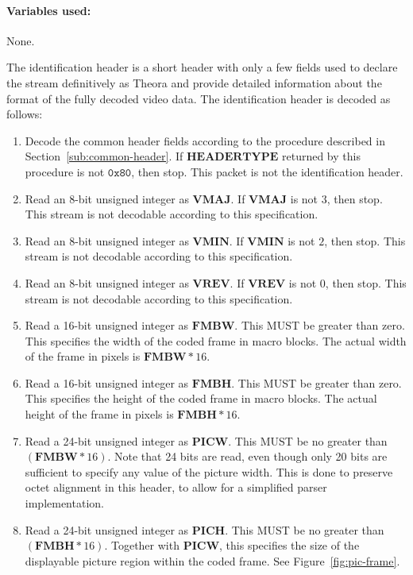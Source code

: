 \documentclass[9pt,letterpaper]{book}
\newcommand{\bitvar}[1]{\ensuremath{\mathbf{\bm{#1}}}}
\newcommand{\hex}[1]{\ensuremath{\mathtt{0x#1}}}
\numberwithin{equation}{chapter}
\numberwithin{figure}{chapter}
\numberwithin{table}{chapter}
\begin{document}
\paragraph{Variables used:} None.
\medskip

The identification header is a short header with only a few fields used to
 declare the stream definitively as Theora and provide detailed information
 about the format of the fully decoded video data.
The identification header is decoded as follows:

\begin{enumerate}
\item
Decode the common header fields according to the procedure described in
 Section~\ref{sub:common-header}.
If \bitvar{HEADERTYPE} returned by this procedure is not \hex{80}, then stop.
This packet is not the identification header.
\item
Read an 8-bit unsigned integer as \bitvar{VMAJ}.
If \bitvar{VMAJ} is not $3$, then stop.
This stream is not decodable according to this specification.
\item
Read an 8-bit unsigned integer as \bitvar{VMIN}.
If \bitvar{VMIN} is not $2$, then stop.
This stream is not decodable according to this specification.
\item
Read an 8-bit unsigned integer as \bitvar{VREV}.
If \bitvar{VREV} is not $0$, then stop.
This stream is not decodable according to this specification.
\item
Read a 16-bit unsigned integer as \bitvar{FMBW}.
This MUST be greater than zero.
This specifies the width of the coded frame in macro blocks.
The actual width of the frame in pixels is $\bitvar{FMBW}*16$.
\item
Read a 16-bit unsigned integer as \bitvar{FMBH}.
This MUST be greater than zero.
This specifies the height of the coded frame in macro blocks.
The actual height of the frame in pixels is $\bitvar{FMBH}*16$.
\item
Read a 24-bit unsigned integer as \bitvar{PICW}.
This MUST be no greater than $(\bitvar{FMBW}*16)$.
Note that 24 bits are read, even though only 20 bits are sufficient to specify
 any value of the picture width.
This is done to preserve octet alignment in this header, to allow for a
 simplified parser implementation.
\item
Read a 24-bit unsigned integer as \bitvar{PICH}.
This MUST be no greater than $(\bitvar{FMBH}*16)$.
Together with \bitvar{PICW}, this specifies the size of the displayable picture
 region within the coded frame.
See Figure~\ref{fig:pic-frame}.

\end{enumerate}
\end{document}
